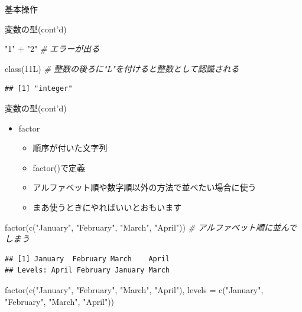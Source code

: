 \documentclass[
  ignorenonframetext,
]{beamer}
\newenvironment{Shaded}{\begin{snugshade}}{\end{snugshade}}
\newcommand{\AttributeTok}[1]{\textcolor[rgb]{0.77,0.63,0.00}{#1}}
\newcommand{\CommentTok}[1]{\textcolor[rgb]{0.56,0.35,0.01}{\textit{#1}}}
\newcommand{\FunctionTok}[1]{\textcolor[rgb]{0.00,0.00,0.00}{#1}}
\newcommand{\NormalTok}[1]{#1}
\newcommand{\SpecialCharTok}[1]{\textcolor[rgb]{0.00,0.00,0.00}{#1}}
\newcommand{\StringTok}[1]{\textcolor[rgb]{0.31,0.60,0.02}{#1}}
\providecommand{\tightlist}{%
  \setlength{\itemsep}{0pt}\setlength{\parskip}{0pt}}
\begin{document}
\begin{frame}[fragile]{基本操作}
\begin{block}{変数の型(cont'd)}
\begin{Shaded}
\begin{Highlighting}[]
\StringTok{"1"} \SpecialCharTok{+} \StringTok{"2"} \CommentTok{\# エラーが出る}
\end{Highlighting}
\end{Shaded}

\begin{Shaded}
\begin{Highlighting}[]
\FunctionTok{class}\NormalTok{(11L) }\CommentTok{\# 整数の後ろに"L"を付けると整数として認識される}
\end{Highlighting}
\end{Shaded}

\begin{verbatim}
## [1] "integer"
\end{verbatim}
\end{block}

\begin{block}{変数の型(cont'd)}
\protect\hypertarget{ux5909ux6570ux306eux578bcontd-1}{}
\begin{itemize}
\tightlist
\item
  factor

  \begin{itemize}
  \tightlist
  \item
    順序が付いた文字列
  \item
    factor()で定義
  \item
    アルファベット順や数字順以外の方法で並べたい場合に使う
  \item
    まあ使うときにやればいいとおもいます
  \end{itemize}
\end{itemize}

\begin{Shaded}
\begin{Highlighting}[]
\FunctionTok{factor}\NormalTok{(}\FunctionTok{c}\NormalTok{(}\StringTok{"January"}\NormalTok{, }\StringTok{"February"}\NormalTok{, }\StringTok{"March"}\NormalTok{, }\StringTok{"April"}\NormalTok{)) }\CommentTok{\# アルファベット順に並んでしまう}
\end{Highlighting}
\end{Shaded}

\begin{verbatim}
## [1] January  February March    April   
## Levels: April February January March
\end{verbatim}

\begin{Shaded}
\begin{Highlighting}[]
\FunctionTok{factor}\NormalTok{(}\FunctionTok{c}\NormalTok{(}\StringTok{"January"}\NormalTok{, }\StringTok{"February"}\NormalTok{, }\StringTok{"March"}\NormalTok{, }\StringTok{"April"}\NormalTok{), }
       \AttributeTok{levels =} \FunctionTok{c}\NormalTok{(}\StringTok{"January"}\NormalTok{, }\StringTok{"February"}\NormalTok{, }\StringTok{"March"}\NormalTok{, }\StringTok{"April"}\NormalTok{))}
\end{Highlighting}
\end{Shaded}


\end{block}
\end{frame}
\end{document}

